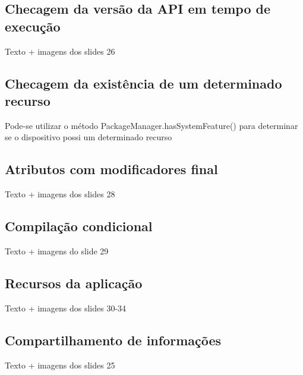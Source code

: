 \subsection{Checagem da versão da API em tempo de execução}

Texto + imagens dos slides 26

\subsection{Checagem da existência de um determinado recurso}
Pode-se utilizar o método PackageManager.hasSystemFeature() para determinar se o 
dispositivo possi um determinado recurso

\subsection{Atributos com modificadores final}

Texto + imagens dos slides 28


\subsection{Compilação condicional}

Texto + imagens do slide 29


\subsection{Recursos da aplicação}

Texto + imagens dos slides 30-34


\subsection{Compartilhamento de informações}

Texto + imagens dos slides 25

